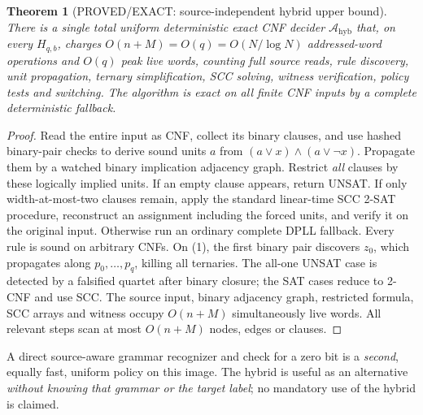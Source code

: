 \documentclass[11pt]{article}
\newtheorem{theorem}{Theorem}
\begin{document}
\begin{theorem}[PROVED/EXACT: source-independent hybrid upper bound]
There is a single total uniform deterministic exact CNF decider
$\mathcal A_{\mathrm{hyb}}$ that, on every $H_{q,b}$, charges
$O(n+M)=O(q)=O(N/\log N)$ addressed-word operations and $O(q)$
peak live words, counting full source reads, rule discovery,
unit propagation, ternary simplification, SCC solving, witness
verification, policy tests and switching. The algorithm is exact on
\emph{all} finite CNF inputs by a complete deterministic fallback.
\end{theorem}
\begin{proof}
Read the entire input as CNF, collect its binary clauses, and use
hashed binary-pair checks to derive sound units $a$ from
$(a\vee x)\wedge(a\vee\neg x)$. Propagate them by a watched
binary implication adjacency graph. Restrict \emph{all} clauses by
these logically implied units. If an empty clause appears, return
UNSAT. If only width-at-most-two clauses remain, apply the standard
linear-time SCC 2-SAT procedure, reconstruct an assignment including
the forced units, and verify it on the original input. Otherwise run
an ordinary complete DPLL fallback. Every rule is sound on arbitrary
CNFs. On (1), the first binary pair discovers $z_0$, which
propagates along $p_0,\ldots,p_q$, killing all ternaries.
The all-one UNSAT case is detected by a falsified quartet after
binary closure; the SAT cases reduce to 2-CNF and use SCC.
The source input, binary adjacency graph, restricted formula,
SCC arrays and witness occupy $O(n+M)$ simultaneously live words.
All relevant steps scan at most $O(n+M)$ nodes, edges or clauses.
\end{proof}
A direct source-aware grammar recognizer and check for a zero bit
is a \emph{second}, equally fast, uniform policy on this image.
The hybrid is useful as an alternative \emph{without knowing that
grammar or the target label}; no mandatory use of the hybrid is
claimed.
\end{document}
